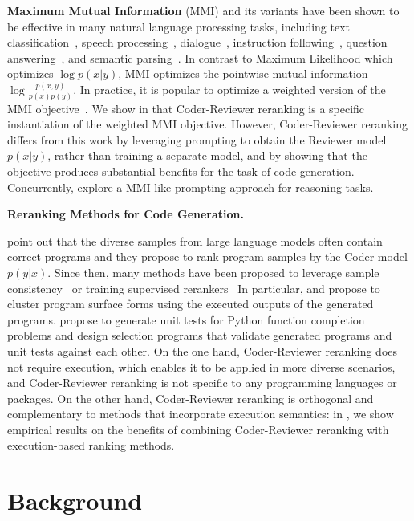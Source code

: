 \documentclass[nohyperref]{article}
\theoremstyle{plain}
\theoremstyle{definition}
\theoremstyle{remark}
\renewcommand{\paragraph}[1]{
     \textbf{#1} 
 }
\begin{document}
\paragraph{Maximum Mutual Information}(MMI) and its variants have been shown to be effective in many natural language processing tasks, including text classification~\citep{noisy-classification}, speech processing~\citep{Bahl1986MaximumMI}, dialogue~\citep{mmi-diversity}, instruction following~\citep{pragmatic-inference}, question answering~\citep{generative-qa}, and semantic parsing~\citep{rerank-parsing}.
In contrast to Maximum Likelihood which optimizes $\log p(x|y)$, 
MMI optimizes the pointwise mutual information $\log \frac{p(x,y)}{p(x)p(y)}$.
In practice, it is popular to optimize a weighted version of the MMI objective~\cite{mmi-diversity}. We show in  that Coder-Reviewer reranking is a specific instantiation of the weighted MMI objective.
However, Coder-Reviewer reranking differs from this work by
leveraging prompting to obtain the Reviewer model $p(x|y)$, rather than training a separate model, and by showing that the objective produces substantial benefits for the task of code generation. Concurrently, \citet{flipped} explore a MMI-like prompting approach for reasoning tasks.


\paragraph{Reranking Methods for Code Generation.}
\citet{codex} point out that the diverse samples from large language models often contain correct programs and they propose to rank program samples by the Coder model $p(y|x)$.
Since then, many methods have been proposed to leverage sample consistency~\citep{mbr} or training supervised rerankers~\citep{fault-aware}
In particular, \citet{mbr} and \citet{alphacode} propose to cluster program surface forms using the executed outputs of the generated programs.
\citet{codet} propose to generate unit tests for Python function completion problems and design selection programs that validate generated programs and unit tests against each other.
On the one hand, Coder-Reviewer reranking does not require execution, which enables it to be applied in more diverse scenarios, and Coder-Reviewer reranking is not specific to any programming languages or packages.
On the other hand, Coder-Reviewer reranking is orthogonal and complementary to methods that incorporate execution semantics:
in , we show empirical results on the benefits of combining Coder-Reviewer reranking with execution-based ranking methods. \section{Background}
\end{document}
